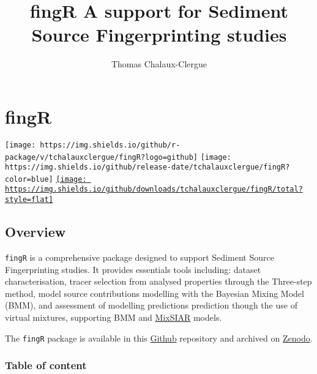 \documentclass[
]{article}
\title{fingR A support for Sediment Source Fingerprinting studies}
\author{Thomas Chalaux-Clergue}
\date{}
\begin{document}
\maketitle

\hypertarget{fingr}{%
\section{\texorpdfstring{fingR }{fingR }}\label{fingr}}

\texttt{[image: https://img.shields.io/github/r-package/v/tchalauxclergue/fingR?logo=github]}
\texttt{[image: https://img.shields.io/github/release-date/tchalauxclergue/fingR?color=blue]}
\href{https://doi.org/10.5281/zenodo.10044404}{}
\href{http://www.repostatus.org/\#active}{\texttt{[image: https://img.shields.io/github/downloads/tchalauxclergue/fingR/total?style=flat]}
}

\hypertarget{overview}{%
\subsection{Overview}\label{overview}}

\texttt{fingR} is a comprehensive package designed to support Sediment
Source Fingerprinting studies. It provides essentials tools including:
dataset characterisation, tracer selection from analysed properties
through the Three-step method, model source contributions modelling with
the Bayesian Mixing Model (BMM), and assessment of modelling predictions
prediction though the use of virtual mixtures, supporting BMM and
\href{http://brianstock.github.io/MixSIAR/index.html}{MixSIAR} models.

The \texttt{fingR} package is available in this
\href{https://github.com/tchalauxclergue/fingR}{Github} repository and
archived on \href{https://zenodo.org/records/10796375}{Zenodo}.

\hypertarget{table-of-content}{%
\subsubsection{Table of content}\label{table-of-content}}
\end{document}
